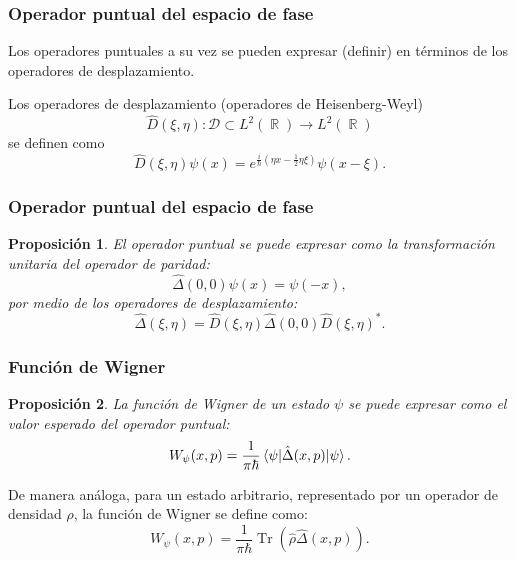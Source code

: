 \documentclass[10pt]{beamer}
\DeclareMathOperator{\R}{\mathbb{R}}
\DeclareMathOperator{\Tr}{Tr}
\newtheorem{proposition}{Proposición}
\begin{document}
  \begin{frame}
    \frametitle{Operador puntual del espacio de fase}

    Los operadores puntuales a su vez se pueden expresar
    (definir) en términos de los operadores de
    desplazamiento.

    \vspace{10pt}

    \begin{definition}
      Los operadores de desplazamiento (operadores de
      Heisenberg-Weyl) 
      \begin{equation}
        \hat D(\xi,\eta) : \mathcal D \subset L^2(\R) \to
        L^2(\R)
      \end{equation}
      se definen como
      \begin{equation}
        \hat D(\xi,\eta) \psi(x)
        = e^{\frac{i}{\hbar} (\eta x - \frac{1}{2} \eta \xi)}
        \psi(x - \xi).
      \end{equation}
    \end{definition}
  \end{frame}

  \begin{frame}
    \frametitle{Operador puntual del espacio de fase}

    \begin{proposition}
      El operador puntual se puede expresar como la
      transformación unitaria del operador de paridad:
      \begin{equation}
        \hat \Delta(0,0)\psi(x) 
        = \psi(-x),
      \end{equation}
      por medio de los operadores de desplazamiento:
      \begin{equation}
        \hat \Delta(\xi,\eta)
        = \hat D(\xi,\eta) \hat\Delta(0,0) \hat
        D(\xi,\eta)^{*}.
      \end{equation}
    \end{proposition}
  \end{frame}

  \begin{frame}
    \frametitle{Función de Wigner}

    \begin{proposition}
      La función de Wigner de un estado $\psi$ se puede
      expresar como el valor esperado del operador puntual:
      \begin{equation}
        W_\psi(x,p)
        = \frac{1}{\pi \hbar} \braket{\psi|\hat
          \Delta(x,p)|\psi}.
      \end{equation}
    \end{proposition}

    De manera análoga, para un estado arbitrario,
    representado por un operador de densidad $\rho$, la
    función de Wigner se define como:
    \begin{equation}
      W_\psi(x,p)
      = \frac{1}{\pi \hbar} \Tr\left( \hat \rho \hat
      \Delta(x,p) \right).
    \end{equation}
  \end{frame}
\end{document}
